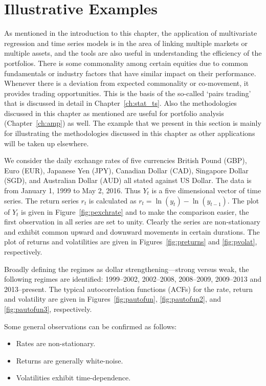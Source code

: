 \section{Illustrative Examples}


As mentioned in the introduction to this chapter, the application of multivariate regression and time series models is in the area of linking multiple markets or multiple assets, and the tools are also useful in understanding the efficiency of the portfolios. There is some commonality among certain equities due to common fundamentals or industry factors that have similar impact on their performance. Whenever there is a deviation from expected commonality or co-movement, it provides trading opportunities. This is the basis of the so-called `pairs trading' that is discussed in detail in Chapter~\ref{ch:stat_ts}. Also the methodologies discussed in this chapter as mentioned are useful for portfolio analysis (Chapter~\ref{ch:amp}) as well. The example that we present in this section is mainly for illustrating the methodologies discussed in this chapter as other applications will be taken up elsewhere.


We consider the daily exchange rates of five currencies British Pound (GBP), Euro (EUR), Japanese Yen (JPY), Canadian Dollar (CAD), Singapore Dollar (SGD), and Australian Dollar (AUD) all stated against US Dollar. The data is from January 1, 1999 to May 2, 2016. Thus $Y_t$ is a five dimensional vector of time series. The return series $r_t$ is calculated as $r_t= \ln(y_t) - \ln(y_{t-1})$. The plot of $Y_t$ is given in Figure~\ref{fig:pexchrate} and to make the comparison easier, the first observation in all series are set to unity. Clearly the series are non-stationary and exhibit common upward and downward movements in certain durations. The plot of returns and volatilities are given in Figures~\ref{fig:preturns} and \ref{fig:pvolat}, respectively. 


Broadly defining the regimes as dollar strengthening---strong versus weak, the following regimes are identified: 1999--2002, 2002--2008, 2008--2009, 2009--2013 and 2013--present. The typical autocorrelation functions (ACFs) for the rate, return and volatility are given in Figures~\ref{fig:pautofun}, \ref{fig:pautofun2}, and \ref{fig:pautofun3}, respectively.


Some general observations can be confirmed as follows:
	\begin{itemize}
	\item Rates are non-stationary.
	\item Returns are generally white-noise.
	\item Volatilities exhibit time-dependence.
	\end{itemize}


